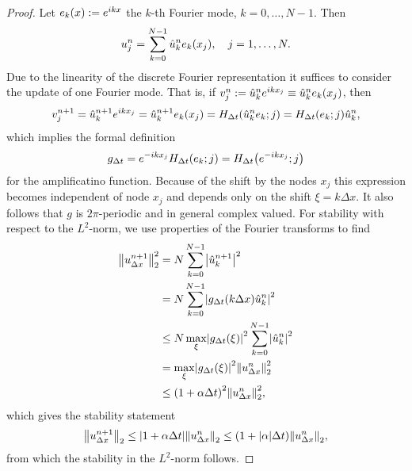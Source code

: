 \begin{proof}
	Let \(e_k\parentheses*{x} := e^{ikx}\) the \(k\)-th Fourier mode, \(k = 0, \ldots, N - 1\).
	Then
	\[
		u_j^n = \sum_{k = 0}^{N - 1}\hat{u}_k^n e_k\parentheses*{x_j}, \quad j = 1, \ldots, N.
	\]
	Due to the linearity of the discrete Fourier representation it suffices to consider the update of one Fourier mode.
	That is, if \(v_j^n := \hat{u}_k^n e^{ikx_j} \equiv \hat{u}_k^n e_k\parentheses*{x_j}\), then
	\[
		v_j^{n + 1} = \hat{u}_k^{n + 1}e^{ikx_j} = \hat{u}_k^{n + 1}e_k\parentheses*{x_j} = H_{\Delta t}\parentheses*{\hat{u}_k^n e_k; j} = H_{\Delta t}\parentheses*{e_k; j}\hat{u}_k^n,
	\]
	which implies the formal definition
	\[
		g_{\Delta t} = e^{-ikx_j}H_{\Delta t}\parentheses*{e_k; j} = H_{\Delta t}\parentheses*{e^{-ikx_j}; j}
	\]
	for the amplificatino function.
	Because of the shift by the nodes \(x_j\) this expression becomes independent of node \(x_j\) and depends only on the shift \(\xi = k\Delta x\).
	It also follows that \(g\) is \(2\pi\)-periodic and in general complex valued.
	For stability with respect to the \(L^2\)-norm, we use properties of the Fourier transforms to find
	\begin{align*}
		\norm*{u_{\Delta x}^{n + 1}}_2^2 &= N\sum_{k = 0}^{N - 1}\absolute*{\hat{u}_k^{n + 1}}^2\\
		&= N\sum_{k = 0}^{N - 1}\absolute*{g_{\Delta t}\parentheses*{k\Delta x}\hat{u}_k^n}^2\\
		&\le N\max_\xi\absolute*{g_{\Delta t}\parentheses*{\xi}}^2 \sum_{k = 0}^{N - 1}\absolute*{\hat{u}_k^n}^2\\
		&= \max_\xi\absolute*{g_{\Delta t}\parentheses*{\xi}}^2 \norm*{u_{\Delta x}^n}_2^2\\
		&\le \parentheses*{1 + \alpha\Delta t}^2 \norm*{u_{\Delta x}^n}_2^2,
	\end{align*}
	which gives the stability statement
	\[
		\norm*{u_{\Delta x}^{n + 1}}_2 \le \absolute*{1 + \alpha\Delta t}\norm*{u_{\Delta x}^n}_2 \le \parentheses*{1 + \absolute*{\alpha}\Delta t}\norm*{u_{\Delta x}^n}_2,
	\]
	from which the stability in the \(L^2\)-norm follows.
\end{proof}

